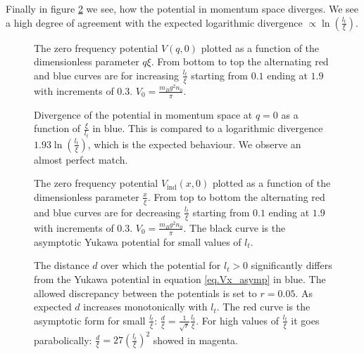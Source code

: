 Finally in figure \ref{fig.Vq0} we see, how the potential in momentum space diverges. We see a high degree of agreement with the expected logarithmic divergence $\propto \ln\left(\frac{l_t}{\xi}\right)$. 

\begin{figure} 
\begin{center}  
  
\caption{The zero frequency potential $V(q,0)$ plotted as a function of the dimensionless parameter $q\xi$. From bottom to top the alternating red and blue curves are for increasing $\frac{l_t}{\xi}$ starting from $0.1$ ending at $1.9$ with increments of $0.3$. $V_0 = \frac{m_Bg^2n_0}{\pi}$.}  
\label{fig.Vq}  
\end{center}    
\end{figure}

\begin{figure} 
\begin{center}  
  
\caption{Divergence of the potential in momentum space at $q=0$ as a function of $\frac{\xi}{l_t}$ in blue. This is compared to a logarithmic divergence $1.93\ln\left(\frac{l_t}{\xi}\right)$, which is the expected behaviour. We observe an almost perfect match.}  
\label{fig.Vq0}  
\end{center}    
\end{figure}

\begin{figure} 
\begin{center}  
  
\caption{The zero frequency potential $V_\text{ind}(x,0)$ plotted as a function of the dimensionless parameter $\frac{x}{\xi}$. From top to bottom the alternating red and blue curves are for decreasing $\frac{l_t}{\xi}$ starting from $0.1$ ending at $1.9$ with increments of $0.3$. $V_0 = \frac{m_Bg^2n_0}{\pi}$. The black curve is the asymptotic Yukawa potential for small values of $l_t$.}  
\label{fig.Vx}  
\end{center}    
\end{figure}

\begin{figure} 
\begin{center}  
  
\caption{The distance $d$ over which the potential for $l_t > 0$ significantly differs from the Yukawa potential in equation \eqref{eq.Vx_asymp} in blue. The allowed discrepancy between the potentials is set to $r=0.05$. As expected $d$ increases monotonically with $l_t$. The red curve is the asymptotic form for small $\frac{l_t}{\xi}$: $\frac{d}{\xi}=\frac{1}{\sqrt{r}}\frac{l_t}{\xi}$. For high values of $\frac{l_t}{\xi}$ it goes parabolically: $\frac{d}{\xi}=27\left(\frac{l_t}{\xi}\right)^2$ showed in magenta.}  
\label{fig.Vx_disc}  
\end{center}    
\end{figure}


